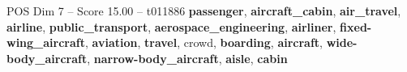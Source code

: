 \begin{textsample}{POS Dim 7 – Score 15.00 – t011886}  \label{ex:f7_pos_035}
\textbf{passenger}, \textbf{aircraft\_cabin}, \textbf{air\_travel}, \textbf{airline}, \textbf{public\_transport}, \textbf{aerospace\_engineering}, \textbf{airliner}, \textbf{fixed-wing\_aircraft}, \textbf{aviation}, \textbf{travel}, crowd, \textbf{boarding}, \textbf{aircraft}, \textbf{wide-body\_aircraft}, \textbf{narrow-body\_aircraft}, \textbf{aisle}, \textbf{cabin}

\end{textsample}
